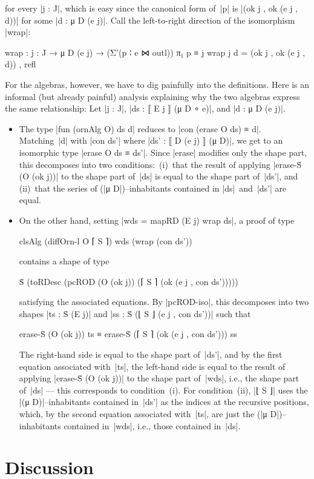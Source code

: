 for every |j : J|, which is easy since the canonical form of~|p| is |(ok j , ok (e j , d))| for some |d : μ D (e j)|.
Call the left-to-right direction of the isomorphism |wrap|:
\begin{code}
wrap : {j : J} → μ D (e j) → (Σ'(p ∶ e ⋈ outl)) π₁ p ≡ j
wrap {j} d = (ok j , ok (e j , d)) , refl
\end{code}
For the algebras, however, we have to dig painfully into the definitions.
Here is an informal (but already painful) analysis explaining why the two algebras express the same relationship:
Let |j : J|, |ds : ⟦ E j ⟧ (μ D ∘ e)|, and |d : μ D (e j)|.
\begin{itemize}
\item The type |fun (ornAlg O) ds d| reduces to |con (erase O ds) ≡ d|.
Matching~|d| with |con ds'| where |ds' : ⟦ D (e j) ⟧ (μ D)|, we get to an isomorphic type |erase O ds ≡ ds'|.
Since |erase| modifies only the shape part, this decomposes into two conditions: \,(i)~that the result of applying |erase-Ṡ (O (ok j))| to the shape part of~|ds| is equal to the shape part of~|ds'|, and \,(ii)~that the series of (|μ D|)--inhabitants contained in |ds|~and~|ds'| are equal.
\item On the other hand, setting |wds = mapRD (E j) wrap ds|, a proof of type
\begin{code}
clsAlg (diffOrn-l O ⌈ S ⌉) wds (wrap (con ds'))
\end{code}
contains a shape of type
\begin{code}
Ṡ (toRDesc (pcROD (O (ok j)) (⌈ S ⌉ (ok (e j , con ds')))))
\end{code}
satisfying the associated equations.
By |pcROD-iso|, this decomposes into two shapes |ts : Ṡ (E j)| and |ss : Ṡ (⌊ S ⌋ (e j , con ds'))| such that
\begin{code}
erase-Ṡ (O (ok j)) ts ≡ erase-Ṡ (⌈ S ⌉ (ok (e j , con ds'))) ss
\end{code}
The right-hand side is equal to the shape part of~|ds'|, and by the first equation associated with~|ts|, the left-hand side is equal to the result of applying |erase-Ṡ (O (ok j))| to the shape part of~|wds|, i.e., the shape part of~|ds| --- this corresponds to condition~(i).
For condition~(ii), |⌊ S ⌋| uses the |(μ D)|--inhabitants contained in~|ds'| as the indices at the recursive positions, which, by the second equation associated with~|ts|, are just the (|μ D|)--inhabitants contained in~|wds|, i.e., those contained in~|ds|.
\end{itemize}


\section{Discussion}
\label{sec:equivalence-discussion}

